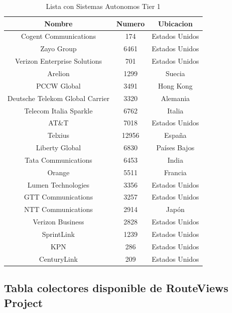 \begin{table}[ht]
{}  %

\begin{tabular}{|c|c|c|}
\hline
\textbf{Nombre} & \textbf{Numero} & \textbf{Ubicacion} \\
\hline
Cogent Communications & 174 & Estados Unidos \\
Zayo Group  & 6461 &   Estados Unidos\\
Verizon Enterprise Solutions  & 701 &   Estados Unidos\\
Arelion & 1299 &   Suecia\\
PCCW Global & 3491 & Hong Kong\\
Deutsche Telekom Global Carrier &  	3320 & Alemania\\
Telecom Italia Sparkle & 6762 & Italia\\
AT\&T & 7018 & Estados Unidos\\
Telxius & 12956 &   España\\
Liberty Global & 6830 & Países Bajos\\
Tata Communications & 6453 & India\\
Orange & 5511 & Francia\\
Lumen Technologies & 3356 & Estados Unidos\\
GTT Communications & 3257 &   Estados Unidos\\
NTT Communications & 2914 & Japón\\
Verizon Business & 2828 & Estados Unidos \\
SprintLink & 1239 & Estados Unidos \\
KPN & 286 & Estados Unidos \\
CenturyLink & 209 & Estados Unidos \\
\hline
\end{tabular}
\caption{Lista con Sistemas Autonomos Tier 1}
\label{tab:tier_1_ases}
\end{table}





\subsection{Tabla colectores disponible de RouteViews Project}

